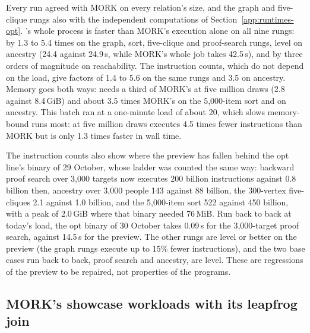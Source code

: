 Every run agreed with MORK on every relation's size, and the graph and
five-clique rungs also with the independent computations of
Section~\ref{app:runtimes-opt}.  \CeTTa{}'s whole process is faster than
MORK's execution alone on all nine rungs: by 1.3 to 5.4 times on the graph,
sort, five-clique and proof-search rungs, level on ancestry (24.4 against
24.9\,s, while MORK's whole job takes 42.5\,s), and by three orders of
magnitude on reachability.  The instruction counts, which do not depend on the
load, give factors of 1.4 to 5.6 on the same rungs and 3.5 on ancestry.  Memory
goes both ways: \CeTTa{} needs a third of MORK's at five million draws
(2.8 against 8.4\,GiB) and about 3.5 times MORK's on the 5,000-item sort and
on ancestry.  This batch ran at a one-minute load of about 20, which slows
memory-bound runs most: at five million draws \CeTTa{} executes 4.5 times fewer
instructions than MORK but is only 1.3 times faster in wall time.

The instruction counts also show where the preview has fallen behind the opt
line's binary of 29 October, whose ladder was counted the same way: backward
proof search over 3,000 targets now executes 200 billion instructions against
0.8 billion then, ancestry over 3,000 people 143 against 88 billion, the
300-vertex five-cliques 2.1 against 1.0 billion, and the 5,000-item sort 522
against 450 billion, with a peak of 2.0\,GiB where that binary needed
76\,MiB.  Run back to back at today's load, the opt binary of 30 October takes
0.09\,s for the 3,000-target proof search, against 14.5\,s for the preview.
The other rungs are level or better on the preview (the graph rungs execute up
to 15\% fewer instructions), and the two base cases run back to back, proof
search and ancestry, are level.  These are
regressions of the preview to be repaired, not properties of the programs.

\subsection{MORK's showcase workloads with its leapfrog join}
\label{app:runtimes-leapfrog}

